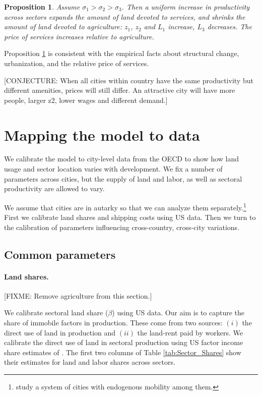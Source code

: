 \documentclass[12pt]{article}
\newtheorem{proposition}{Proposition}
\begin{document}
\begin{proposition}\label{prop:comparative_static}
Assume $\sigma_1>\sigma_2>\sigma_3$. Then a uniform increase in productivity across sectors expands the amount of land devoted to services, and shrinks the amount of land devoted to agriculture: $z_1$, $z_2$ and $L_1$ increase, $L_3$ decreases. The price of services increases relative to agriculture.
\end{proposition}

Proposition \ref{prop:comparative_static} is consistent with the empirical facts about structural change, urbanization, and the relative price of services. 

[CONJECTURE: When all cities within country have the same productivity but different amenities, prices will still differ. An attractive city will have more people, larger z2, lower wages and different demand.]

\section{Mapping the model to data}
We calibrate the model to city-level data from the OECD to show how land usage and sector location varies with development. We fix a number of parameters across cities, but the supply of land and labor, as well as sectoral productivity are allowed to vary.

We assume that cities are in autarky so that we can analyze them separately.\footnote{ study a system of cities with endogenous mobility among them.} First we calibrate land shares and shipping costs using US data. Then we turn to the calibration of parameters influencing cross-country, cross-city variations.

\subsection{Common parameters}
\paragraph{Land shares.}
[FIXME: Remove agriculture from this section.]

We calibrate sectoral land share ($\beta$) using US data. Our aim is to capture the share of immobile factors in production. These come from two sources: $(i)$ the direct use of land in production and $(ii)$ the land-rent paid by workers. We calibrate the direct use of land in sectoral production using US factor income share estimates of . The first two columns of Table \ref{tab:Sector_Shares} show their estimates for land and labor shares across sectors.
\end{document}
